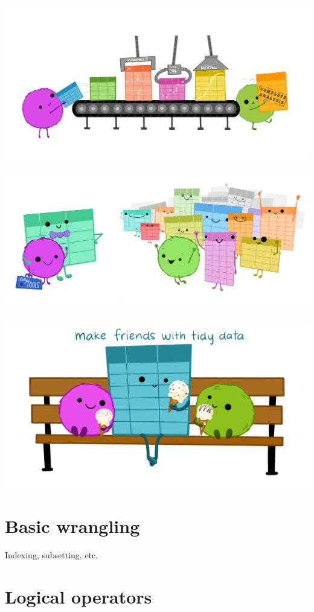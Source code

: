\documentclass[
]{book}
\begin{document}
\includegraphics{images/tidydata_5.jpg}

\includegraphics{images/tidydata_6.jpg}

\includegraphics{images/tidydata_7.jpg}

\hypertarget{basic-wrangling}{%
\chapter{Basic wrangling}\label{basic-wrangling}}

Indexing, subsetting, etc.

\hypertarget{logicals}{%
\chapter{Logical operators}\label{logicals}}
\end{document}
